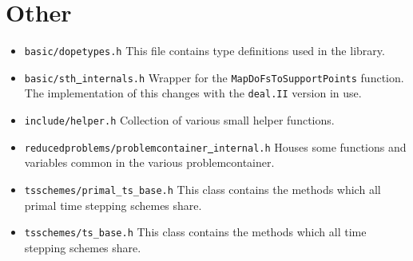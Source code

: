 \section{Other}
\begin{itemize}
  \item \texttt{basic/dopetypes.h} This file contains type definitions used in the library. 
\item \texttt{basic/sth\underline{ }internals.h} Wrapper for the \texttt{MapDoFsToSupportPoints} function. The implementation of this changes with the \texttt{deal.II} version in use.
\item \texttt{include/helper.h} Collection of various small helper functions.
\item \texttt{reducedproblems/problemcontainer\underline{ }internal.h} Houses some functions and variables common in the various problemcontainer.
\item \texttt{tsschemes/primal\_ts\_base.h}  This class contains the methods which all primal time stepping schemes share.
\item \texttt{tsschemes/ts\_base.h}  This class contains the methods which all time stepping schemes share.
\end{itemize}
